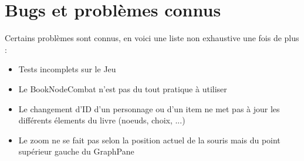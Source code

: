 	\section{Bugs et problèmes connus}

		Certains problèmes sont connus, en voici une liste non exhaustive une fois de plus :

		\begin{itemize}
			\item{Tests incomplets sur le Jeu}
			\item{Le BookNodeCombat n'est pas du tout pratique à utiliser}
			\item{Le changement d'ID d'un personnage ou d'un item ne met pas à jour les différents élements du livre (noeuds, choix, ...)}
			\item{Le zoom ne se fait pas selon la position actuel de la souris mais du point supérieur gauche du GraphPane}
		\end{itemize}
